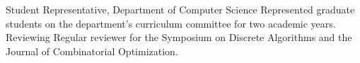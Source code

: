 {}
{Student Representative, Department of Computer Science}
{Represented graduate students on the department's curriculum committee for two academic years.}
%
%
{}
{Reviewing}
{Regular reviewer for the Symposium on Discrete Algorithms and the Journal of Combinatorial Optimization.
}

